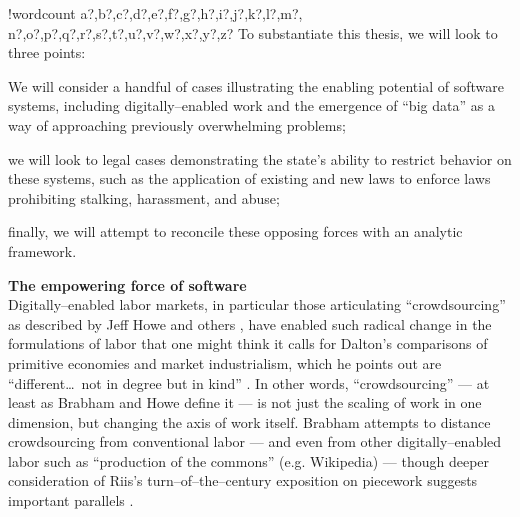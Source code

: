 \documentclass[11pt]{article}
\newcounter{words}
\newenvironment{counted}{%
  \setcounter{words}{0}
  \SearchList!{wordcount}{\stepcounter{words}}
    {a?,b?,c?,d?,e?,f?,g?,h?,i?,j?,k?,l?,m?,
    n?,o?,p?,q?,r?,s?,t?,u?,v?,w?,x?,y?,z?}
  \UndoBoundary{'}
  \SearchOrder{p;}}{%
  \StopSearching}
\newcommand{\sectitle}[1]{\textbf{#1}\\}
\begin{document}
\begin{counted}
To substantiate this thesis,
we will look to three points:
\begin{inlinelist}
\item We will consider a handful of cases illustrating the enabling potential of software systems, including digitally--enabled work and the emergence of ``big data'' as a way of approaching previously overwhelming problems;
\item we will look to legal cases demonstrating the state's ability to restrict behavior on these systems, such as the application of existing and new laws to enforce laws prohibiting stalking, harassment, and abuse;
\item finally, we will attempt to reconcile these opposing forces with an analytic framework.
\end{inlinelist}

\sectitle{The empowering force of software}
Digitally--enabled labor markets,
in particular those articulating ``crowdsourcing'' as described by Jeff Howe and others
\cite{brabham2013crowdsourcing,howe2008crowdsourcing},
have enabled such radical change in the formulations of labor that one might think it calls for Dalton's comparisons of primitive economies and market industrialism, which he points out are
``different\dots\ not in degree but in kind''
\cite{dalton1961economic}.
In other words, ``crowdsourcing''
--- at least as Brabham and Howe define it ---
is not just the scaling of work in one dimension, but changing the axis of work itself.
Brabham attempts to distance crowdsourcing from conventional labor
--- and even from other digitally--enabled labor such as ``production of the commons'' (e.g. Wikipedia) ---
though deeper consideration of Riis's turn--of--the--century exposition on piecework suggests important parallels 
\cite{brabham2013crowdsourcing,riis2004other}.


\end{counted}
\end{document}
